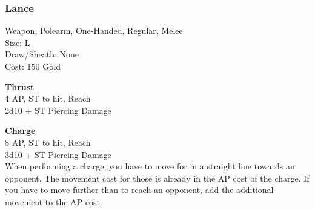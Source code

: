 \subsubsection{Lance}\label{weapon:lance}
Weapon, Polearm, One-Handed, Regular, Melee\\
Size: L\\
Draw/Sheath: None\\
Cost: 150 Gold

\textbf{Thrust}\\
4 AP, ST to hit,  Reach\\
2d10 + \texttimes ST Piercing Damage

\textbf{Charge}\\
8 AP, ST to hit,  Reach\\
3d10 + \texttimes ST Piercing Damage\\
When performing a charge, you have to move for  in a straight line towards an opponent.
The movement cost for those  is already in the AP cost of the charge.
If you have to move further than  to reach an opponent, add the additional movement to the AP cost.